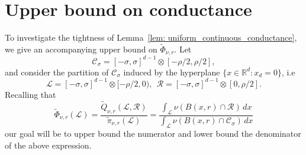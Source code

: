 \documentclass{report}
\newcommand{\Reals}{\mathbb{R}}
\newcommand{\1}{\mathbf{1}}
\newcommand{\Rd}{\Reals^d}
\newcommand{\mc}[1]{\mathcal{#1}}
\newcommand{\wt}[1]{\widetilde{#1}}
\theoremstyle{alden}
\theoremstyle{aldenthm}
\theoremstyle{definition}
\theoremstyle{remark}
\begin{document}
\section{Upper bound on conductance}
To investigate the tightness of Lemma~\ref{lem: uniform_continuous_conductance}, we give an accompanying upper bound on $\wt{\Phi}_{\nu,r}$. Let 
\begin{equation*}
\mc{C}_{\sigma} = [-\sigma,\sigma]^{d - 1} \otimes [-\rho/2,\rho/2],
\end{equation*}
and consider the partition of $\mc{C}_{\sigma}$ induced by the hyperplane $\{x \in \Rd: x_d = 0\}$, i.e
\begin{equation*}
\mc{L} = [-\sigma,\sigma]^{d - 1} \otimes [-\rho/2,0),~~\mc{R} = [-\sigma,\sigma]^{d - 1} \otimes [0,\rho/2].
\end{equation*}
Recalling that 
\begin{equation*}
\wt{\Phi}_{\nu,r}(\mc{L}) = \frac{\wt{Q}_{\nu,r}(\mc{L},\mc{R})}{\wt{\pi}_{\nu,r}(\mc{L})} = \frac{\int_{\mc{L}} \nu(B(x,r) \cap \mc{R}) \,dx}{\int_{\mc{L}} \nu(B(x,r) \cap \mc{C}_{\sigma}) \,dx} 
\end{equation*}
our goal will be to upper bound the numerator and lower bound the denominator of the above expression.
\end{document}
